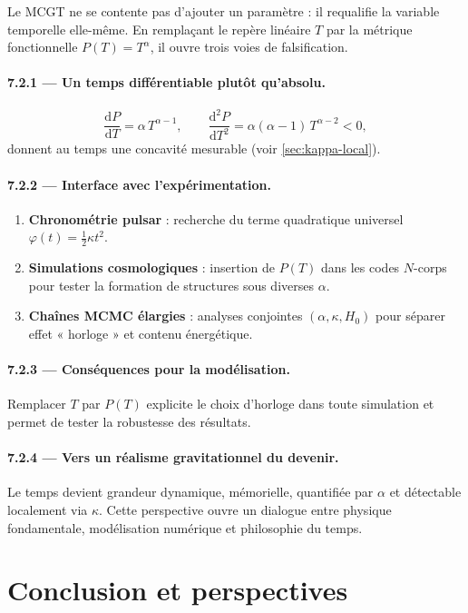 \documentclass[11pt]{article}
\begin{document}
Le MCGT ne se contente pas d’ajouter un paramètre : il requalifie la
variable temporelle elle-même.  En remplaçant le repère linéaire
\(T\) par la métrique fonctionnelle \(P(T)=T^{\alpha}\), il ouvre trois
voies de falsification.

\paragraph{7.2.1 — Un temps différentiable plutôt qu’absolu.}
\[
\frac{\mathrm dP}{\mathrm dT}=\alpha\,T^{\alpha-1},
\qquad
\frac{\mathrm d^{2}P}{\mathrm dT^{2}}=
\alpha(\alpha-1)\,T^{\alpha-2}<0,
\]
donnent au temps une concavité mesurable
(voir \autoref{sec:kappa-local}).

\paragraph{7.2.2 — Interface avec l’expérimentation.}
\begin{enumerate}[label=\alph*)]
  \item \textbf{Chronométrie pulsar} :
        recherche du terme quadratique universel
        \(\varphi(t)=\tfrac12\kappa t^{2}\).
  \item \textbf{Simulations cosmologiques} :
        insertion de \(P(T)\) dans les codes \(N\)-corps pour tester la
        formation de structures sous diverses \(\alpha\).
  \item \textbf{Chaînes MCMC élargies} :
        analyses conjointes \((\alpha,\kappa,H_{0})\)
        pour séparer effet « horloge » et contenu énergétique.
\end{enumerate}

\paragraph{7.2.3 — Conséquences pour la modélisation.}
Remplacer \(T\) par \(P(T)\) explicite le choix d’horloge dans
toute simulation et permet de tester la robustesse des résultats.

\paragraph{7.2.4 — Vers un réalisme gravitationnel du devenir.}
Le temps devient grandeur dynamique, mémorielle, quantifiée par
\(\alpha\) et détectable localement via \(\kappa\).
Cette perspective ouvre un dialogue entre
physique fondamentale, modélisation numérique
et philosophie du temps.

\section{Conclusion et perspectives}
\label{sec:conclusion}
\end{document}
